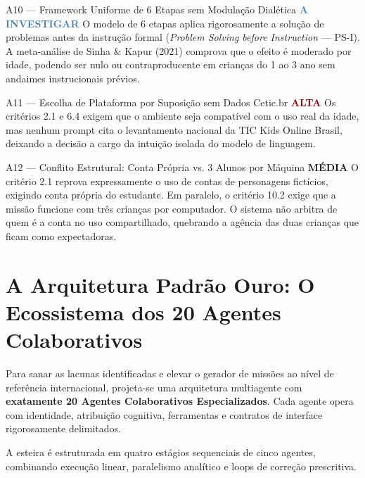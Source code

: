 \documentclass[11pt,a4paper]{article}
\newcommand{\sevalta}{\textcolor{DarkRed}{\textbf{ALTA}}}
\newcommand{\sevmedia}{\textcolor{DarkYellow}{\textbf{M\'EDIA}}}
\newcommand{\sevinv}{\textcolor{SteelBlue}{\textbf{A INVESTIGAR}}}
\begin{document}
\begin{achadobox}{A10 --- Framework Uniforme de 6 Etapas sem Modula\c{c}\~ao Dial\'etica \hfill \sevinv}
O modelo de 6 etapas aplica rigorosamente a solu\c{c}\~ao de problemas antes da instru\c{c}\~ao formal (\emph{Problem Solving before Instruction} --- PS-I). A meta-an\'alise de Sinha \& Kapur (2021) comprova que o efeito \'e moderado por idade, podendo ser nulo ou contraproducente em crian\c{c}as do 1\textordmasculine{} ao 3\textordmasculine{} ano sem andaimes instrucionais pr\'evios.
\end{achadobox}

\begin{achadobox}{A11 --- Escolha de Plataforma por Suposi\c{c}\~ao sem Dados Cetic.br \hfill \sevalta}
Os crit\'erios 2.1 e 6.4 exigem que o ambiente seja compat\'ivel com o uso real da idade, mas nenhum prompt cita o levantamento nacional da TIC Kids Online Brasil, deixando a decis\~ao a cargo da intui\c{c}\~ao isolada do modelo de linguagem.
\end{achadobox}

\begin{achadobox}{A12 --- Conflito Estrutural: Conta Pr\'opria vs. 3 Alunos por Máquina \hfill \sevmedia}
O crit\'erio 2.1 reprova expressamente o uso de contas de personagens fict\'icios, exigindo conta pr\'opria do estudante. Em paralelo, o crit\'erio 10.2 exige que a miss\~ao funcione com tr\^es crian\c{c}as por computador. O sistema n\~ao arbitra de quem \'e a conta no uso compartilhado, quebrando a ag\^encia das duas crian\c{c}as que ficam como expectadoras.
\end{achadobox}

\section{A Arquitetura Padr\~ao Ouro: O Ecossistema dos 20 Agentes Colaborativos}

Para sanar as lacunas identificadas e elevar o gerador de miss\~oes ao n\'ivel de refer\^encia internacional, projeta-se uma arquitetura multiagente com \textbf{exatamente 20 Agentes Colaborativos Especializados}. Cada agente opera com identidade, atribui\c{c}\~ao cognitiva, ferramentas e contratos de interface rigorosamente delimitados.

A esteira \'e estruturada em quatro est\'agios sequenciais de cinco agentes, combinando execu\c{c}\~ao linear, paralelismo anal\'itico e loops de corre\c{c}\~ao prescritiva.
\end{document}
